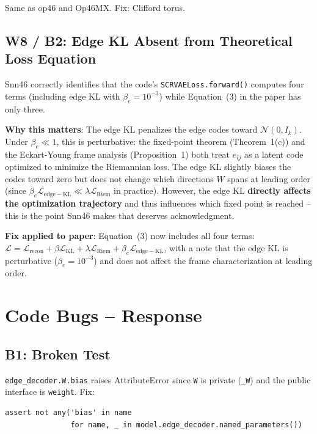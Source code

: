 \documentclass{article}
\begin{document}
\begin{accept}
Same as op46 and Op46MX. Fix: Clifford torus.
\end{accept}

\subsection{W8 / B2: Edge KL Absent from Theoretical Loss Equation}

\begin{accept}
Snn46 correctly identifies that the code's \texttt{SCRVAELoss.forward()}
computes four terms (including edge KL with $\beta_e = 10^{-3}$) while
Equation~(3) in the paper has only three.

\textbf{Why this matters}: The edge KL penalizes the edge codes toward
$\mathcal{N}(0, I_k)$. Under $\beta_e \ll 1$, this is perturbative: the
fixed-point theorem (Theorem~1(c)) and the Eckart-Young frame analysis
(Proposition~1) both treat $e_{ij}$ as a latent code optimized to minimize
the Riemannian loss. The edge KL slightly biases the codes toward zero but
does not change which directions $W$ spans at leading order (since
$\beta_e \mathcal{L}_{\mathrm{edge-KL}} \ll \lambda \mathcal{L}_{\mathrm{Riem}}$
in practice). However, the edge KL \textbf{directly affects the optimization
trajectory} and thus influences which fixed point is reached -- this is the
point Snn46 makes that deserves acknowledgment.

\textbf{Fix applied to paper}: Equation~(3) now includes all four terms:
$\mathcal{L} = \mathcal{L}_{\mathrm{recon}} + \beta\mathcal{L}_{\mathrm{KL}}
+ \lambda\mathcal{L}_{\mathrm{Riem}} + \beta_e\mathcal{L}_{\mathrm{edge-KL}}$,
with a note that the edge KL is perturbative ($\beta_e = 10^{-3}$) and does
not affect the frame characterization at leading order.
\end{accept}

\section{Code Bugs -- Response}

\subsection{B1: Broken Test}

\begin{accept}[Accepted]
\texttt{edge\_decoder.W.bias} raises AttributeError since \texttt{W} is private
(\texttt{\_W}) and the public interface is \texttt{weight}. Fix:
\begin{verbatim}
assert not any('bias' in name
               for name, _ in model.edge_decoder.named_parameters())
\end{verbatim}
\end{accept}
\end{document}
